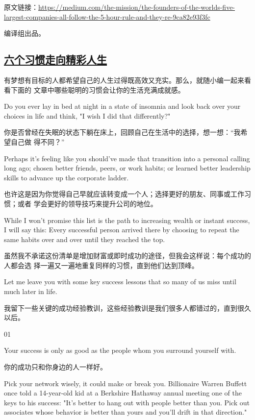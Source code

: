 \documentclass[11pt]{ctexart}
\begin{document}
{{{{原文链接：\url{https://medium.com/the-mission/the-founders-of-the-worlds-five-largest-companies-all-follow-the-5-hour-rule-and-they-re-9ca82e93f3fc}

编译组出品。
\subsection{\href{http://www.sohu.com/a/227869340\_497891?\_f=index\_chan25news\_192}{六个习惯走向精彩人生}}
\label{sec:org78b4e3b}
有梦想有目标的人都希望自己的人生过得既高效又充实。那么，就随小编一起来看看下面的
文章中哪些聪明的习惯会让你的生活充满成就感。



Do you ever lay in bed at night in a state of insomnia and look back over your
choices in life and think, "I wish I did that differently?"

你是否曾经在失眠的状态下躺在床上，回顾自己在生活中的选择，想一想：“我希望自己做
得不同？”

Perhaps it's feeling like you should've made that transition into a personal
calling long ago; chosen better friends, peers, or work habits; or learned
better leadership skills to advance up the corporate ladder.

也许这是因为你觉得自己早就应该转变成一个人；选择更好的朋友、同事或工作习惯；或者
学会更好的领导技巧来提升公司的地位。

While I won't promise this list is the path to increasing wealth or instant
success, I will say this: Every successful person arrived there by choosing to
repeat the same habits over and over until they reached the top.

虽然我不承诺这份清单是增加财富或即时成功的途径，但我会这样说：每个成功的人都会选
择一遍又一遍地重复同样的习惯，直到他们达到顶峰。

Let me leave you with some key success lessons that so many of us miss until
much later in life.

我留下一些关键的成功经验教训，这些经验教训是我们很多人都错过的，直到很久以后。

01

Your success is only as good as the people whom you surround yourself with.

你的成功只和你身边的人一样好。



Pick your network wisely, it could make or break you. Billionaire Warren Buffett
once told a 14-year-old kid at a Berkshire Hathaway annual meeting one of the
keys to his success: "It's better to hang out with people better than you. Pick
out associates whose behavior is better than yours and you'll drift in that
direction."

}}}}
\end{document}
